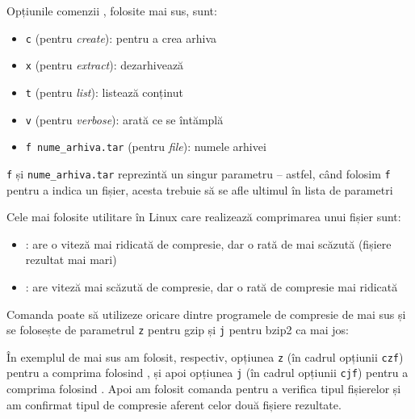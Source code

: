 Opțiunile comenzii , folosite mai sus, sunt:
\begin{itemize}
  \item \texttt{c} (pentru \textit{create}): pentru a crea arhiva
  \item \texttt{x} (pentru \textit{extract}): dezarhivează
  \item \texttt{t} (pentru \textit{list}): listează conținut
  \item \texttt{v} (pentru \textit{verbose}): arată ce se întămplă
  \item \texttt{f nume_arhiva.tar} (pentru \textit{file}): numele arhivei
\end{itemize}

\begin{note}[Observație]
\texttt{f} și \texttt{nume_arhiva.tar} reprezintă un singur parametru – astfel,
când folosim
\texttt{f} pentru a indica un fișier, acesta trebuie să se afle ultimul în lista
de parametri
\end{note}

Cele mai folosite utilitare în Linux care realizează comprimarea unui fișier sunt:

\begin{itemize}
	\item {}: are o viteză mai ridicată de compresie, dar o rată de
          mai scăzută (fișiere rezultat mai mari)
	\item {}: are viteză mai scăzută de compresie, dar o rată de
		compresie mai ridicată
\end{itemize}

Comanda  poate să utilizeze oricare dintre programele de
compresie de mai sus și se folosește de parametrul \texttt{z} pentru gzip și
\texttt{j} pentru bzip2 ca mai jos:


În exemplul de mai sus am folosit, respectiv, opțiunea \texttt{z} (în cadrul opțiunii \texttt{czf}) pentru a comprima folosind , și apoi opțiunea \texttt{j} (în cadrul opțiunii \texttt{cjf}) pentru a comprima folosind . Apoi am folosit comanda  pentru a verifica tipul fișierelor și am confirmat tipul de compresie aferent celor două fișiere rezultate.

